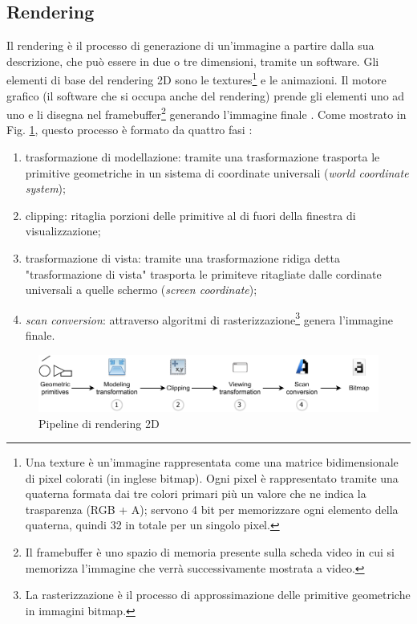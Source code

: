 \subsection{Rendering}
Il rendering è il processo di generazione di un'immagine a partire dalla sua descrizione, che può essere in due o tre dimensioni, tramite un software. Gli elementi di base del rendering 2D sono le textures\footnote{Una texture è un'immagine rappresentata come una matrice bidimensionale di pixel colorati (in inglese bitmap). Ogni pixel è rappresentato tramite una quaterna formata dai tre colori primari più un valore che ne indica la trasparenza (RGB + A); servono 4 bit per memorizzare ogni elemento della quaterna, quindi 32 in totale per un singolo pixel.} e le animazioni. Il motore grafico (il software che si occupa anche del rendering) prende gli elementi uno ad uno e li disegna nel framebuffer\footnote{Il framebuffer è uno spazio di memoria presente sulla scheda video in cui si memorizza l'immagine che verrà successivamente mostrata a video.} generando l'immagine finale \parencite{Efficient_2D_software_rendering}. Come mostrato in Fig. \ref{fig:rendering_pipeline}, questo processo è formato da quattro fasi \parencite{Computer_Vision_A_Modern_Approach}:

\begin{enumerate}
    \item trasformazione di modellazione: tramite una trasformazione trasporta le primitive geometriche in un sistema di coordinate universali (\textit{world coordinate system});
    \item clipping: ritaglia porzioni delle primitive al di fuori della finestra di visualizzazione;
    \item trasformazione di vista: tramite una trasformazione ridiga detta "trasformazione di vista" trasporta le primiteve ritagliate dalle cordinate universali a quelle schermo (\textit{screen coordinate});
    \item \textit{scan conversion}: attraverso algoritmi di rasterizzazione\footnote{La rasterizzazione è il processo di approssimazione delle primitive geometriche in immagini bitmap.} genera l'immagine finale.
\end{enumerate}

\begin{figure}[H]
	\includegraphics[width=\linewidth]{immagini/rendering_pipeline}
	\caption{Pipeline di rendering 2D}
	\label{fig:rendering_pipeline}
\end{figure}


